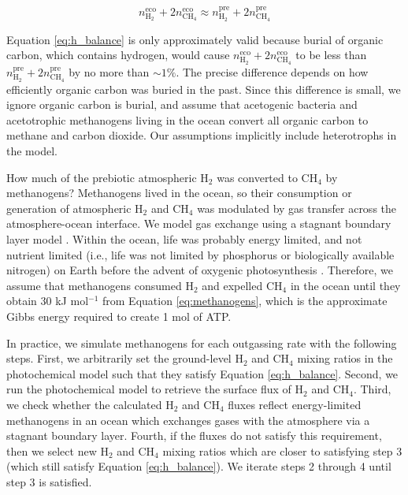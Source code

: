 \begin{equation}
  \label{eq:h_balance}
  n_\mathrm{H_2}^\mathrm{eco} + 2 n_\mathrm{CH_4}^\mathrm{eco} \approx n_\mathrm{H_2}^\mathrm{pre} + 2 n_\mathrm{CH_4}^\mathrm{pre}
\end{equation}

Equation \eqref{eq:h_balance} is only approximately valid because burial of organic carbon, which contains hydrogen, would cause $n_\mathrm{H_2}^\mathrm{eco} + 2 n_\mathrm{CH_4}^\mathrm{eco}$ to be less than $n_\mathrm{H_2}^\mathrm{pre} + 2 n_\mathrm{CH_4}^\mathrm{pre}$ by no more than $\sim 1\%$. The precise difference depends on how efficiently organic carbon was buried in the past. Since this difference is small, we ignore organic carbon is burial, and assume that acetogenic bacteria and acetotrophic methanogens living in the ocean convert all organic carbon to methane and carbon dioxide. Our assumptions implicitly include heterotrophs in the model.

How much of the prebiotic atmospheric H$_2$ was converted to CH$_4$ by methanogens? Methanogens lived in the ocean, so their consumption or generation of atmospheric H$_2$ and CH$_4$ was modulated by gas transfer across the atmosphere-ocean interface. We model gas exchange using a stagnant boundary layer model \citep{Kharecha_2005,Liss_1974}. Within the ocean, life was probably energy limited, and not nutrient limited (i.e., life was not limited by phosphorus or biologically available nitrogen) on Earth before the advent of oxygenic photosynthesis \citep{Canfield_2006,Kharecha_2005,Ward_2019}. Therefore, we assume that methanogens consumed H$_2$ and expelled CH$_4$ in the ocean until they obtain 30 kJ mol$^{-1}$ from Equation \eqref{eq:methanogens}, which is the approximate Gibbs energy required to create 1 mol of ATP.

In practice, we simulate methanogens for each outgassing rate with the following steps. First, we arbitrarily set the ground-level H$_2$ and CH$_4$ mixing ratios in the photochemical model such that they satisfy Equation \eqref{eq:h_balance}. Second, we run the photochemical model to retrieve the surface flux of H$_2$ and CH$_4$. Third, we check whether the calculated H$_2$ and CH$_4$ fluxes reflect energy-limited methanogens in an ocean which exchanges gases with the atmosphere via a stagnant boundary layer. Fourth, if the fluxes do not satisfy this requirement, then we select new H$_2$ and CH$_4$ mixing ratios which are closer to satisfying step 3 (which still satisfy Equation \eqref{eq:h_balance}). We iterate steps 2 through 4 until step 3 is satisfied. 

